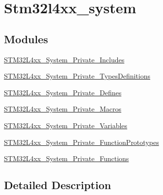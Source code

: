 \hypertarget{group__stm32l4xx__system}{}\section{Stm32l4xx\+\_\+system}
\label{group__stm32l4xx__system}
\subsection*{Modules}
\begin{DoxyCompactItemize}
\item 
\hyperlink{group___s_t_m32_l4xx___system___private___includes}{S\+T\+M32\+L4xx\+\_\+\+System\+\_\+\+Private\+\_\+\+Includes}
\item 
\hyperlink{group___s_t_m32_l4xx___system___private___types_definitions}{S\+T\+M32\+L4xx\+\_\+\+System\+\_\+\+Private\+\_\+\+Types\+Definitions}
\item 
\hyperlink{group___s_t_m32_l4xx___system___private___defines}{S\+T\+M32\+L4xx\+\_\+\+System\+\_\+\+Private\+\_\+\+Defines}
\item 
\hyperlink{group___s_t_m32_l4xx___system___private___macros}{S\+T\+M32\+L4xx\+\_\+\+System\+\_\+\+Private\+\_\+\+Macros}
\item 
\hyperlink{group___s_t_m32_l4xx___system___private___variables}{S\+T\+M32\+L4xx\+\_\+\+System\+\_\+\+Private\+\_\+\+Variables}
\item 
\hyperlink{group___s_t_m32_l4xx___system___private___function_prototypes}{S\+T\+M32\+L4xx\+\_\+\+System\+\_\+\+Private\+\_\+\+Function\+Prototypes}
\item 
\hyperlink{group___s_t_m32_l4xx___system___private___functions}{S\+T\+M32\+L4xx\+\_\+\+System\+\_\+\+Private\+\_\+\+Functions}
\end{DoxyCompactItemize}


\subsection{Detailed Description}
